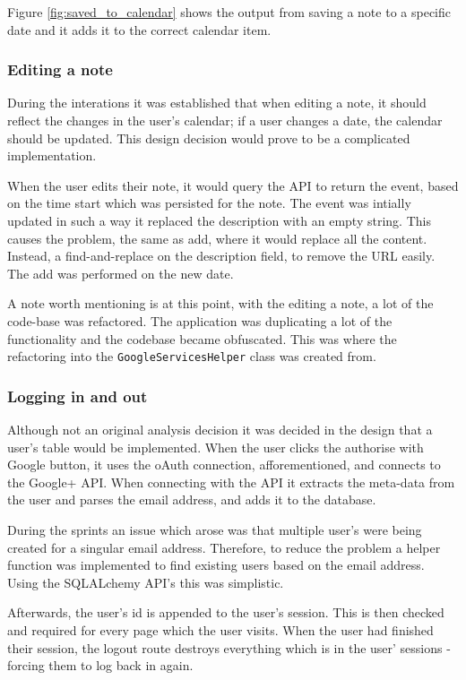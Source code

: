 {{{{{{Figure \ref{fig:saved_to_calendar} shows the output from saving a note to a specific date and it adds it to the correct calendar item.

\subsubsection{Editing a note}
During the interations it was established that when editing a note, it should reflect the changes in the user's calendar; if a user changes a date, the calendar should be updated. This design decision would prove to be a complicated implementation.

When the user edits their note, it would query the API to return the event, based on the time start which was persisted for the note. The event was intially updated in such a way it replaced the description with an empty string. This causes the problem, the same as add, where it would replace all the content. Instead, a find-and-replace on the description field, to remove the URL easily. The add was performed on the new date.

A note worth mentioning is at this point, with the editing a note, a lot of the code-base was refactored. The application was duplicating a lot of the functionality and the codebase became obfuscated. This was where the refactoring into the \texttt{GoogleServicesHelper} class was created from.

\subsubsection{Logging in and out}
Although not an original analysis decision it was decided in the design that a user's table would be implemented. When the user clicks the authorise with Google button, it uses the oAuth connection, afforementioned, and connects to the Google+ API. When connecting with the API it extracts the meta-data from the user and parses the email address, and adds it to the database.

During the sprints an issue which arose was that multiple user's were being created for a singular email address. Therefore, to reduce the problem a helper function was implemented to find existing users based on the email address. Using the SQLALchemy API's this was simplistic.

Afterwards, the user's id is appended to the user's session. This is then checked and required for every page which the user visits. When the user had finished their session, the logout route destroys everything which is in the user' sessions - forcing them to log back in again.

}}}}}}
